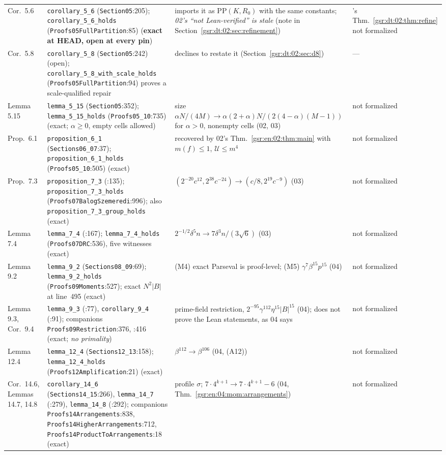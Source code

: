 \documentclass[11pt,letterpaper]{article}
\numberwithin{equation}{section}
\theoremstyle{definition}
\theoremstyle{remark}
\newcommand{\1}{\mathbf 1}
\newcommand{\U}{\mathcal U}
\newcommand{\file}[1]{\nolinkurl{#1}}
\begin{document}
\begin{longtable}{@{}>{\raggedright\arraybackslash}p{} >{\raggedright\arraybackslash}p{} >{\raggedright\arraybackslash}p{} >{\raggedright\arraybackslash}p{}@{}}
Cor.~5.6 & \file{corollary_5_6} (\file{Section05}:205); \file{corollary_5_6_holds} (\file{Proofs05FullPartition}:85) (\textbf{exact at HEAD, open at every pin}) & 02 imports it as $\mathrm{PP}(K,R_0)$ with the same constants; \emph{02's ``not Lean-verified'' is stale} (note in Section~\ref{gsr:dt:02:sec:refinement}) & 02's Thm.~\ref{gsr:dt:02:thm:refine} not formalized\\
Cor.~5.8 & \file{corollary_5_8} (\file{Section05}:242) (open); \file{corollary_5_8_with_scale_holds} (\file{Proofs05FullPartition}:94) proves a scale-qualified repair & 02 declines to restate it (Section~\ref{gsr:dt:02:sec:d8}) & ---\\
Lemma 5.15 & \file{lemma_5_15} (\file{Section05}:352); \file{lemma_5_15_holds} (\file{Proofs05\_10}:735) (exact; $\alpha\ge0$, empty cells allowed) & size $\alpha N/(4M)\to\alpha(2+\alpha)N/(2(4-\alpha)(M-1))$ for $\alpha>0$, nonempty cells (02, 03) & not formalized\\
Prop.~6.1 & \file{proposition_6_1} (\file{Sections06\_07}:37); \file{proposition_6_1_holds} (\file{Proofs05\_10}:505) (exact) & recovered by 02's Thm.~\ref{gsr:en:02:thm:main} with $m(f)\le1$, $\U\le m^4$ & not formalized\\
Prop.~7.3 & \file{proposition_7_3} (:135); \file{proposition_7_3_holds} (\file{Proofs07BalogSzemeredi}:996); also \file{proposition_7_3_group_holds} (exact) & $(2^{-20}c^{12},2^{38}c^{-24})\to(c/8,2^{19}c^{-9})$ (03) & not formalized\\
Lemma 7.4 & \file{lemma_7_4} (:167); \file{lemma_7_4_holds} (\file{Proofs07DRC}:536), five witnesses (exact) & $2^{-1/2}\delta^5n\to7\delta^3n/(3\sqrt6)$ (03) & not formalized\\
Lemma 9.2 & \file{lemma_9_2} (\file{Sections08\_09}:69); \file{lemma_9_2_holds} (\file{Proofs09Moments}:527); exact $N^2|B|$ at line~495 (exact) & (M4) exact Parseval is proof-level; (M5) $\gamma^7\beta^{15}p^{15}$ (04) & not formalized\\
Lemma 9.3, Cor.~9.4 & \file{lemma_9_3} (:77), \file{corollary_9_4} (:91); companions \file{Proofs09Restriction}:376, :416 (exact; \emph{no primality}) & prime-field restriction, $2^{-95}\gamma^{112}\eta^{15}|B|^{15}$ (04); does not prove the Lean statements, as 04 says & not formalized\\
Lemma 12.4 & \file{lemma_12_4} (\file{Sections12\_13}:158); \file{lemma_12_4_holds} (\file{Proofs12Amplification}:21) (exact) & $\beta^{112}\to\beta^{106}$ (04, (A12)) & not formalized\\
Cor.~14.6, Lemmas 14.7, 14.8 & \file{corollary_14_6} (\file{Sections14\_15}:266), \file{lemma_14_7} (:279), \file{lemma_14_8} (:292); companions \file{Proofs14Arrangements}:838, \file{Proofs14HigherArrangements}:712, \file{Proofs14ProductToArrangements}:18 (exact) & profile $\sigma$; $7\cdot4^{k+1}\to7\cdot4^{k+1}-6$ (04, Thm.~\ref{gsr:en:04:mom:arrangements}) & not formalized\\

\end{longtable}
\end{document}
